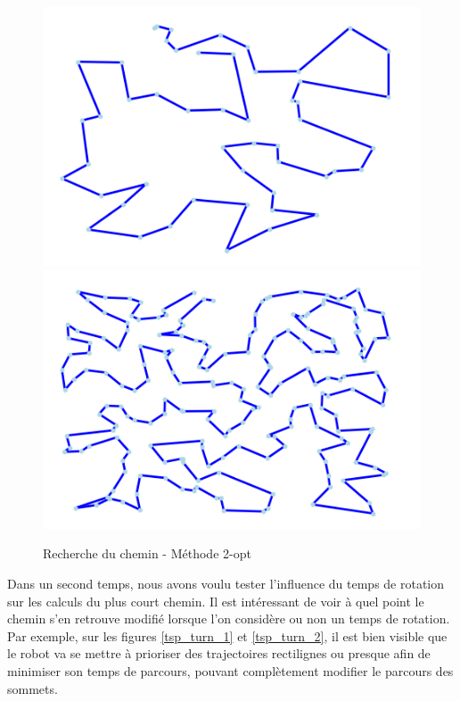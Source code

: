 \documentclass{article}
\begin{document}
\begin{figure}
	\includegraphics[scale=0.4]{image/Exmple50dechet.png}
	\includegraphics[scale=0.4]{image/Exemple200dechet.png}
	\caption{Recherche du chemin - Méthode 2-opt}
	\label{2-opt_dechet}
\end{figure}

Dans un second temps, nous avons voulu tester l'influence du temps de rotation sur les calculs du plus court chemin. Il est intéressant de voir à quel 
point le chemin s'en retrouve modifié lorsque l'on considère ou non un temps de rotation. Par exemple, sur les figures \ref{tsp_turn_1} et \ref{tsp_turn_2}, il est bien visible que le robot va se mettre à prioriser des trajectoires rectilignes ou presque afin de minimiser son temps de parcours, pouvant complètement modifier le parcours des sommets.
\end{document}
